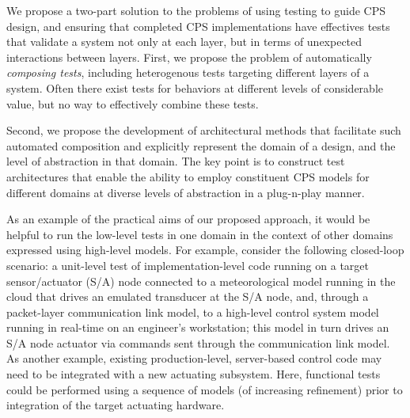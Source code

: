 We propose a two-part solution to the problems of using testing to guide CPS design, and ensuring that completed CPS implementations have effectives tests that validate a system not only at each layer, but in terms of unexpected interactions between layers.  First, we propose the problem of automatically \emph{composing tests}, including heterogenous tests targeting different layers of a system.  Often there exist tests for behaviors at different levels of considerable value, but no way to effectively combine these tests.

Second, we propose the development of architectural methods that facilitate such automated composition and explicitly represent the domain of a design, and the level of abstraction in that domain.  The key point is to construct test architectures  that enable the ability to employ constituent CPS models for different domains at diverse levels of abstraction in a plug-n-play manner.

As an example of the practical aims of our proposed approach, it would be helpful to run the low-level tests in one domain in the context of other domains expressed using high-level models. For example, consider the following closed-loop scenario: a unit-level test of implementation-level code running on a target sensor/actuator (S/A) node connected to a meteorological model running in the cloud that drives an emulated transducer at the S/A node, and, through a packet-layer communication link model, to a high-level control system model running in real-time on an engineer's workstation; this model in turn drives an S/A node actuator via commands sent through the communication link model. As another example, existing production-level, server-based control code may need to be integrated with a new actuating subsystem. Here, functional tests could be performed using a sequence of models (of increasing refinement) prior to integration of the target actuating hardware.
